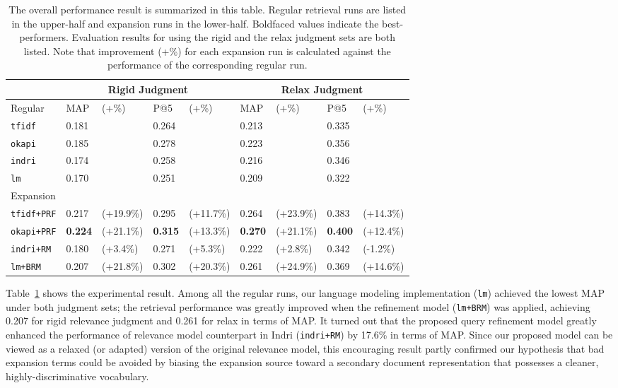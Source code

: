 \begin{table}[ht!]
  \caption{The overall performance result is summarized in this table.  Regular
  retrieval runs are listed in the upper-half and expansion runs in the
  lower-half.  Boldfaced values indicate the best-performers.  Evaluation
  results for using the rigid and the relax judgment sets are both listed.  Note
  that improvement (+\%) for each expansion run is calculated against the
  performance of the corresponding regular run.} \label{t:retrieval}
  \centering
  \begin{tabular}{p{2.4cm}llllllll}
    & \multicolumn{4}{c}{Rigid Judgment} & \multicolumn{4}{c}{Relax Judgment} \\
    \hline
    Regular & MAP & (+\%) & P@5 & (+\%) & MAP & (+\%) & P@5 & (+\%) \\
    \hline
    {\tt tfidf} & 0.181 & & 0.264 & & 0.213 & & 0.335 & \\
    {\tt okapi} & 0.185 & & 0.278 & & 0.223 & & 0.356 & \\
    {\tt indri} & 0.174 & & 0.258 & & 0.216 & & 0.346 & \\
    {\tt lm}    & 0.170 & & 0.251 & & 0.209 & & 0.322 & \\
    \hline
    Expansion & & & & & & & & \\
    \hline
    {\tt tfidf+PRF} & 0.217 & (+19.9\%) & 0.295 & (+11.7\%) & 0.264 & (+23.9\%) & 0.383 & (+14.3\%) \\
    {\tt okapi+PRF} & {\bf 0.224} & (+21.1\%) & {\bf 0.315} & (+13.3\%) & {\bf 0.270} & (+21.1\%) & {\bf 0.400} & (+12.4\%) \\
    {\tt indri+RM} & 0.180 & (+3.4\%) & 0.271 & (+5.3\%) & 0.222 & (+2.8\%) & 0.342 & (-1.2\%) \\
    {\tt lm+BRM} & 0.207 & (+21.8\%) & 0.302 & (+20.3\%) & 0.261 & (+24.9\%) & 0.369 & (+14.6\%)
  \end{tabular}
\end{table}

Table~\ref{t:retrieval} shows the experimental result.  Among all the regular
runs, our language modeling implementation ({\tt lm}) achieved the lowest MAP
under both judgment sets; the retrieval performance was greatly improved when
the refinement model ({\tt lm+BRM}) was applied, achieving 0.207 for rigid
relevance judgment and 0.261 for relax in terms of MAP.  It turned out that the
proposed query refinement model greatly enhanced the performance of relevance
model counterpart in Indri ({\tt indri+RM}) by 17.6\% in terms of MAP.  Since
our proposed model can be viewed as a relaxed (or adapted) version of the
original relevance model, this encouraging result partly confirmed our
hypothesis that bad expansion terms could be avoided by biasing the expansion
source toward a secondary document representation that possesses a cleaner,
highly-discriminative vocabulary.  

